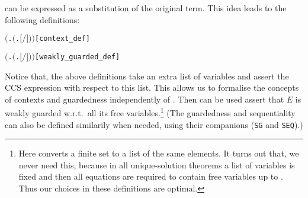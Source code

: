 can be expressed as a \univariate substitution of the original term.
This idea leads to the following definitions:
\begin{alltt}
      \HOLTokenDefEquality{}  \ensuremath{(}\HOLTokenLambda{}.  \ensuremath{(}\HOLTokenLambda{}. \ensuremath{[}\ensuremath{/}\ensuremath{]} \ensuremath{)}\ensuremath{)} \hfill{[context_def]}

      \HOLTokenDefEquality{}  \ensuremath{(}\HOLTokenLambda{}.  \ensuremath{(}\HOLTokenLambda{}. \ensuremath{[}\ensuremath{/}\ensuremath{]} \ensuremath{)}\ensuremath{)} \hfill{[weakly_guarded_def]}
\end{alltt}
Notice that, the above definitions take an extra list of variables  and
assert the CCS expression  with respect to this list. This
allows us to formalise the concepts of contexts and guardedness
independently of . Then  can
be used assert that $E$ is weakly guarded w.r.t.~all its free
variables.\footnote{Here  converts a finite set
  to a list of the same elements. It turns out that, we never need this, because
  in all unique-solution theorems a list of variables  is fixed and
  then all equations are required to contain free variables up to
  . Thus our choices in these definitions are optimal.}
(The guardedness and sequentiality can also be defined similarily
when needed, using
their \univariate companions (\texttt{SG} and \texttt{SEQ}).)

